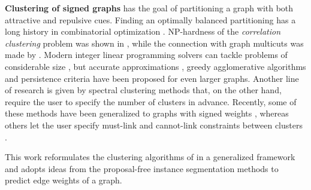 \textbf{Clustering of signed graphs} has the goal of partitioning a graph with both attractive and repulsive cues. Finding an optimally balanced partitioning has a long history in combinatorial optimization \cite{grotschel1989cutting,grotschel1990facets,chopra1993partition}. %
NP-hardness of the \emph{correlation clustering} problem was shown in \cite{bansal2004correlation}, while the connection with graph multicuts was made by \cite{demaine2006correlation}. Modern integer linear programming solvers can tackle problems of considerable size \cite{andres2012globally}, but accurate approximations \cite{pape2017solving,beier2016efficient,yarkony2012fast}, greedy agglomerative algorithms \cite{levinkov2017comparative,wolf2019mutex,keuper2015efficient,kardoostsolving} and persistence criteria \cite{lange2018partial,lange2018combinatorial} have been proposed for even larger graphs. 
Another line of research is given by spectral clustering methods that, on the other hand, require the user to specify the number of clusters in advance. Recently, some of these methods have been generalized to graphs with signed weights \cite{Cucuringu2019SPONGEAG,chiang2012scalable,kunegis2010spectral}, whereas others let the user specify must-link and cannot-link constraints between clusters \cite{rangapuram2012constrained,wang2014constrained,cucuringu2016simple}.

This work reformulates the clustering algorithms of \cite{levinkov2017comparative,wolf2018mutex,keuper2015efficient} in a generalized framework and adopts ideas from the proposal-free instance segmentation methods \cite{liu2018affinity,wolf2018mutex,lee2017superhuman} to predict edge weights of a graph.
